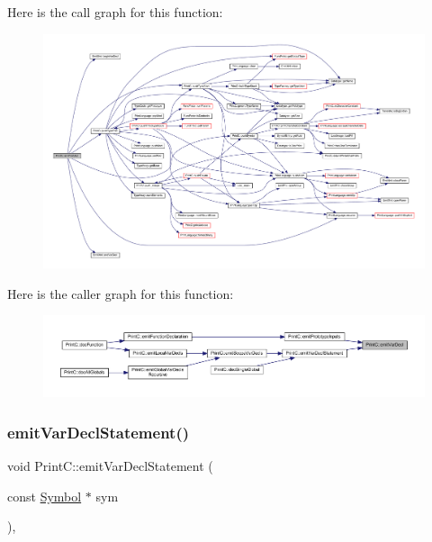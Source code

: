 Here is the call graph for this function\+:
\nopagebreak
\begin{figure}[H]
\begin{center}
\leavevmode
\includegraphics[width=350pt]{class_print_c_ae05bed1958ac3b694bdeda2897e6a1ff_cgraph}
\end{center}
\end{figure}
Here is the caller graph for this function\+:
\nopagebreak
\begin{figure}[H]
\begin{center}
\leavevmode
\includegraphics[width=350pt]{class_print_c_ae05bed1958ac3b694bdeda2897e6a1ff_icgraph}
\end{center}
\end{figure}
\mbox{\label{class_print_c_a56fd9b353cd343909b2700fe42875885}} 
\subsubsection{\texorpdfstring{emitVarDeclStatement()}{emitVarDeclStatement()}}
{\footnotesize\ttfamily void Print\+C\+::emit\+Var\+Decl\+Statement (\begin{DoxyParamCaption}\item[{const \mbox{\hyperlink{class_symbol}{Symbol}} $\ast$}]{sym }\end{DoxyParamCaption})\hspace{0.3cm}{\ttfamily [protected]}, {\ttfamily [virtual]}}



